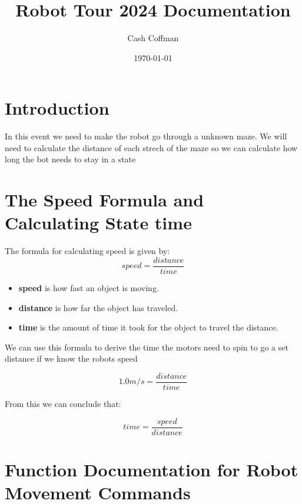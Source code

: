 \documentclass{article} %
\title{Robot Tour 2024 Documentation} %
\author{Cash Coffman} %
\date{\today} %
\begin{document}
\maketitle %

\section{Introduction} %
In this event we need to make the robot go through a unknown maze. We will need to calculate the distance of each strech of the maze so we can calculate how long the bot needs to stay in a state
\section{The Speed Formula and Calculating State time} %
The formula for calculating speed is given by:
\begin{equation} %
    speed = \frac{distance}{time}
\end{equation}

\begin{itemize} %
    \item \textbf{speed} is how fast an object is moving.
    \item \textbf{distance} is how far the object has traveled.
    \item \textbf{time} is the amount of time it took for the object to travel the distance.
\end{itemize}
We can use this formula to derive the time the motors need to spin to go a set distance if we know the robots speed

\begin{equation}
    1.0m/s = \frac{distance}{time}
\end{equation}


From this we can conclude that:

\begin{equation}
    time = \frac{speed}{distance}
\end{equation}
\linebreak

\section{Function Documentation for Robot Movement Commands}
\end{document}
